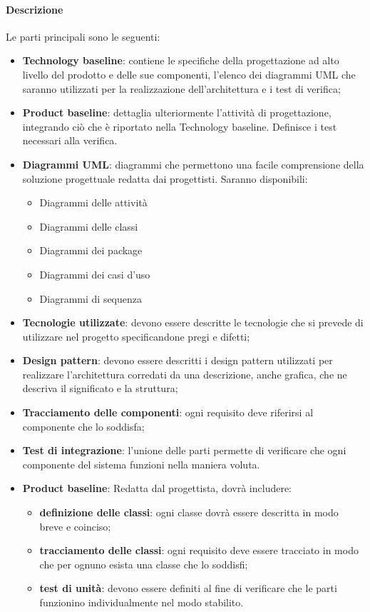 \paragraph{Descrizione}
Le parti principali sono le seguenti:
\begin{itemize}
\item \textbf{Technology baseline}: contiene le specifiche della progettazione ad alto livello del prodotto e delle sue componenti, l'elenco dei diagrammi UML che saranno utilizzati per la realizzazione dell'architettura e i test di verifica;

\item \textbf{Product baseline}: dettaglia ulteriormente l'attività di progettazione,  integrando ciò che è riportato nella Technology baseline. Definisce i test necessari alla verifica.

\item \textbf{Diagrammi UML}: diagrammi che permettono una facile comprensione della soluzione progettuale redatta dai progettisti. Saranno disponibili:
\begin{itemize}
\item Diagrammi delle attività
\item Diagrammi delle classi
\item Diagrammi dei package
\item Diagrammi dei casi d'uso
\item Diagrammi di sequenza
\end{itemize}
\item \textbf{Tecnologie utilizzate}: devono essere descritte le tecnologie che si prevede di utilizzare nel progetto specificandone pregi e difetti;
\item \textbf{Design pattern}: devono essere descritti i design pattern utilizzati per realizzare l'architettura corredati da una descrizione, anche grafica, che ne descriva il significato e la struttura;
\item \textbf{Tracciamento delle componenti}: ogni requisito deve riferirsi al componente che lo soddisfa;
\item \textbf{Test di integrazione}: l'unione delle parti permette di verificare che ogni componente del sistema funzioni nella maniera voluta.
\item \textbf{Product baseline}: Redatta dal progettista, dovrà includere:
    \begin{itemize}
        \item \textbf{definizione delle classi}: ogni classe dovrà essere descritta in modo breve e coinciso;
        \item \textbf{tracciamento delle classi}: ogni requisito deve essere tracciato in modo che per ognuno esista una classe che lo soddisfi;
        \item \textbf{test di unità}: devono essere definiti al fine di verificare che le parti funzionino individualmente nel modo stabilito.
        \end{itemize}
\end{itemize}

